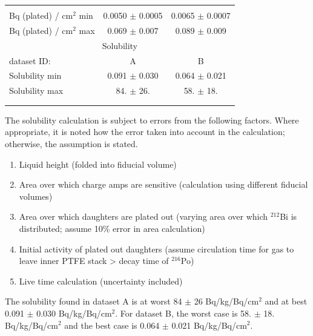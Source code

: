 \begin{table}[ht]
\begin{tabular}{lcc}
\hline \\
Bq (plated) / cm$^{2}$ min & 0.0050  $\pm$ 0.0005  & 0.0065  $\pm$ 0.0007\\
Bq (plated) / cm$^{2}$ max & 0.069  $\pm$ 0.007 & 0.089  $\pm$ 0.009  \\
\hline
\multicolumn{3}{c}{Solubility} \\
\hline
dataset ID: & A &B \\
Solubility min & 0.091 $\pm$ 0.030 & 0.064 $\pm$ 0.021\\
Solubility max & 84. $\pm$ 26. & 58. $\pm$ 18. \\

\\[-5pt]

\\[-5pt]

\hline
\end{tabular}
\label{T:solubility}
\end{table}


The solubility calculation is subject to errors from the following factors. Where appropriate, it is noted how the error taken into account in the calculation; otherwise, the assumption is stated.
\begin{enumerate}
\item Liquid height (folded into fiducial volume)
\item Area over which charge amps are sensitive (calculation using different fiducial volumes)
\item Area over which daughters are plated out (varying area over which $^{212}$Bi is distributed; assume 10\% error in area calculation)
\item Initial activity of plated out daughters (assume circulation time for gas to leave inner PTFE stack > decay time of $^{216}$Po)
\item Live time calculation (uncertainty included)
\end{enumerate}

The solubility found in dataset A is at worst 84 $\pm$ 26 Bq/kg/Bq/cm$^{2}$ and at best 0.091 $\pm$ 0.030 Bq/kg/Bq/cm$^{2}$. For dataset B, the worst case is 58. $\pm$ 18. Bq/kg/Bq/cm$^{2}$ and the best case is 0.064 $\pm$ 0.021 Bq/kg/Bq/cm$^{2}$. 

